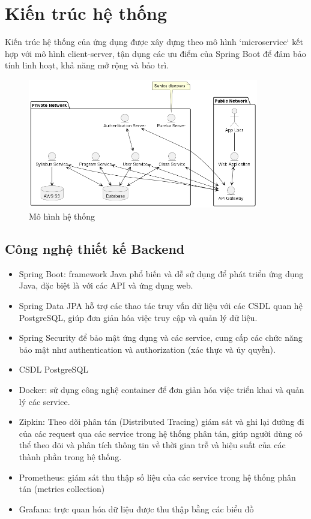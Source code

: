 \documentclass[report.tex]{subfiles}
\begin{document}
\section{Kiến trúc hệ thống}

Kiến trúc hệ thống của ứng dụng được xây dựng theo mô hình `microservice` kết hợp với mô hình client-server,
tận dụng các ưu điểm của Spring Boot để đảm bảo tính linh hoạt, khả năng mở rộng và bảo trì.

\begin{figure}[!htb]
{\centering
\includegraphics[width=380px]{../uml/system.arch.png}
\caption{Mô hình hệ thống}
\par
}
\end{figure}
\FloatBarrier

\subsection{Công nghệ thiết kế Backend}

\begin{itemize}[noitemsep]
  \item Spring Boot: framework Java phổ biến và dễ sử dụng để phát triển ứng dụng Java, đặc biệt là với các API và ứng dụng web.
  \item Spring Data JPA hỗ trợ các thao tác truy vấn dữ liệu với các CSDL quan hệ PostgreSQL, giúp đơn giản hóa việc truy cập và quản lý dữ liệu.
  \item Spring Security để bảo mật ứng dụng và các service, cung cấp các chức năng bảo mật như authentication và authorization (xác thực và ủy quyền).
  \item CSDL PostgreSQL
  \item Docker: sử dụng công nghệ container để đơn giản hóa việc triển khai và quản lý các service.
\end{itemize}

\begin{itemize}[noitemsep]
  \item Zipkin: Theo dõi phân tán (Distributed Tracing) giám sát và ghi lại đường đi của các request qua các service trong hệ thống phân tán, giúp người dùng có thể theo dõi và phân tích thông tin về thời gian trễ và hiệu suất của các thành phần trong hệ thống.
  \item Prometheus: giám sát thu thập số liệu của các service trong hệ thống phân tán (metrics collection)
  \item Grafana: trực quan hóa dữ liệu được thu thập bằng các biểu đồ
\end{itemize}
\end{document}
